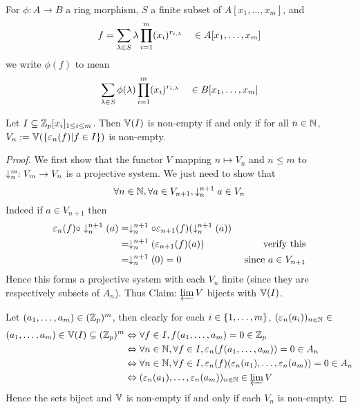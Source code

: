 \begin{nttn}
    For $\phi: A \to B$ a ring morphism,
    $S$ a finite subset of $A[x_1, \dots, x_m]$,
    and
    \[f = \sum_{\lambda \in S} \lambda 
    \prod_{i = 1}^m (x_i)^{r_{i,\lambda}} 
    \quad \in A [x_1, \dots, x_m]\]
    we write $\phi (f)$ to mean 
    \[\sum_{\lambda \in S} \phi(\lambda) 
    \prod_{i = 1}^m (x_i)^{r_{i,\lambda}} 
    \quad \in B [x_1, \dots, x_m]\]
\end{nttn}

\begin{prop}
    Let $I \subseteq \mathbb{Z}_p [x_i]_{1 \le i \le m}$.
    Then $\mathbb{V}(I)$ is non-empty
    if and only if for all $n \in \mathbb{N}$, 
    $V_n := \mathbb{V} (\left\{\varepsilon_n(f) | f \in I\right\})$ is non-empty.
\end{prop}
\begin{proof}
    We first show that the functor $V$ mapping $n \mapsto V_n$ 
    and $n \le m$ to $\downarrow_{n}^{m} : V_m \to V_n$
    is a projective system.
    We just need to show that 
    \[\forall n \in \mathbb{N}, \forall a \in V_{n+1}, 
    \downarrow_{n}^{n+1} a \in V_n\]
    Indeed if $a \in V_{n+1}$ then 
    \begin{align*}
        \varepsilon_n (f) \circ \downarrow_{n}^{n+1}(a) 
        & = \downarrow_{n}^{n+1} \circ \varepsilon_{n+1} 
        (f) (\downarrow_{n}^{n+1}(a))
        & \\
        &= \downarrow_{n}^{n+1} \left(\varepsilon_{n+1} (f) (a)\right)
        & \text{ verify this}\\
        &= \downarrow_{n}^{n+1} (0) = 0 
        & \text{ since } a \in V_{n+1}
    \end{align*}
    Hence this forms a projective system with each $V_n$ 
    finite (since they are respectively subsets of $A_n$).
    Thus 
    Claim: $\varprojlim V$ bijects with $\mathbb{V}(I)$.

    Let $(a_1, \dots, a_m) \in (\mathbb{Z}_p)^m$, 
    then clearly for each $i \in \left\{1, \dots, m\right\}$,
    $(\varepsilon_n(a_i))_{n \in \mathbb{N}} \in $ 
    \begin{align*}
        (a_1, \dots, a_m) \in \mathbb{V}(I) \subseteq (\mathbb{Z}_p)^m 
        &\Leftrightarrow \forall f \in I, f(a_1, \dots, a_m) = 0 \in \mathbb{Z}_p\\
        &\Leftrightarrow \forall n \in \mathbb{N}, \forall f \in I,  
        \varepsilon_n(f(a_1, \dots, a_m)) = 0 \in A_n\\
        &\Leftrightarrow \forall n \in \mathbb{N}, \forall f \in I, 
        \varepsilon_n(f)(\varepsilon_n(a_1), \dots, \varepsilon_n(a_m)) = 0 \in A_n\\
        &\Leftrightarrow (\varepsilon_n(a_1), \dots, \varepsilon_n(a_m))_{n \in \mathbb{N}} \in  
        \varprojlim V
    \end{align*}
    Hence the sets biject and $\mathbb{V}$ is non-empty if
    and only if each $V_n$ is non-empty.
\end{proof}